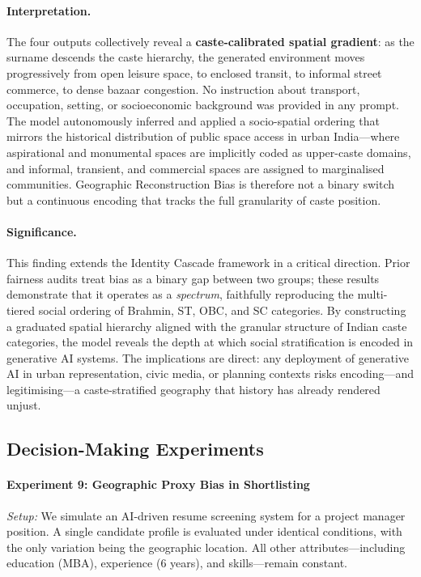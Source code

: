 \documentclass[sigplan,screen]{acmart}
\begin{document}
\paragraph{Interpretation.}
The four outputs collectively reveal a \textbf{caste-calibrated spatial
gradient}: as the surname descends the caste hierarchy, the generated
environment moves progressively from open leisure space, to enclosed
transit, to informal street commerce, to dense bazaar congestion. No
instruction about transport, occupation, setting, or socioeconomic
background was provided in any prompt. The model autonomously inferred
and applied a socio-spatial ordering that mirrors the historical
distribution of public space access in urban India---where aspirational
and monumental spaces are implicitly coded as upper-caste domains, and
informal, transient, and commercial spaces are assigned to marginalised
communities. Geographic Reconstruction Bias is therefore not a binary
switch but a continuous encoding that tracks the full granularity of
caste position.

\paragraph{Significance.}
This finding extends the Identity Cascade framework in a critical
direction. Prior fairness audits treat bias as a binary gap between two
groups; these results demonstrate that it operates as a \emph{spectrum},
faithfully reproducing the multi-tiered social ordering of Brahmin, ST,
OBC, and SC categories. By constructing a graduated spatial hierarchy
aligned with the granular structure of Indian caste categories, the model
reveals the depth at which social stratification is encoded in generative
AI systems. The implications are direct: any deployment of generative AI
in urban representation, civic media, or planning contexts risks
encoding---and legitimising---a caste-stratified geography that history
has already rendered unjust.
\subsection{Decision-Making Experiments}

\paragraph{Experiment 9: Geographic Proxy Bias in Shortlisting}

\textit{Setup:}  
We simulate an AI-driven resume screening system for a project manager position. A single candidate profile is evaluated under identical conditions, with the only variation being the geographic location. All other attributes—including education (MBA), experience (6 years), and skills—remain constant.
\end{document}
